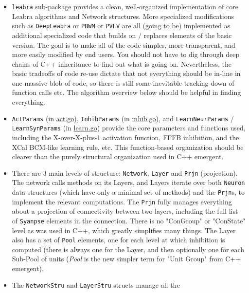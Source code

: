 \begin{itemize}
\item
  \texttt{leabra} sub-package provides a clean, well-organized
  implementation of core Leabra algorithms and Network structures. More
  specialized modifications such as \texttt{DeepLeabra} or \texttt{PBWM}
  or \texttt{PVLV} are all (going to be) implemented as additional
  specialized code that builds on / replaces elements of the basic
  version. The goal is to make all of the code simpler, more
  transparent, and more easily modified by end users. You should not
  have to dig through deep chains of C++ inheritance to find out what is
  going on. Nevertheless, the basic tradeoffs of code re-use dictate
  that not everything should be in-line in one massive blob of code, so
  there is still some inevitable tracking down of function calls etc.
  The algorithm overview below should be helpful in finding everything.
\item
  \texttt{ActParams} (in
  \href{https://github.com/emer/leabra/blob/master/leabra/act.go}{act.go}),
  \texttt{InhibParams} (in
  \href{https://github.com/emer/leabra/blob/master/leabra/inhib.go}{inhib.go}),
  and \texttt{LearnNeurParams} / \texttt{LearnSynParams} (in
  \href{https://github.com/emer/leabra/blob/master/leabra/learn.go}{learn.go})
  provide the core parameters and functions used, including the
  X-over-X-plus-1 activation function, FFFB inhibition, and the XCal
  BCM-like learning rule, etc. This function-based organization should
  be clearer than the purely structural organization used in C++
  emergent.
\item
  There are 3 main levels of structure: \texttt{Network}, \texttt{Layer}
  and \texttt{Prjn} (projection). The network calls methods on its
  Layers, and Layers iterate over both \texttt{Neuron} data structures
  (which have only a minimal set of methods) and the \texttt{Prjn}s, to
  implement the relevant computations. The \texttt{Prjn} fully manages
  everything about a projection of connectivity between two layers,
  including the full list of \texttt{Syanpse} elements in the
  connection. There is no "ConGroup" or "ConState" level as was used in
  C++, which greatly simplifies many things. The Layer also has a set of
  \texttt{Pool} elements, one for each level at which inhibition is
  computed (there is always one for the Layer, and then optionally one
  for each Sub-Pool of units (\emph{Pool} is the new simpler term for
  "Unit Group" from C++ emergent).
\item
  The \texttt{NetworkStru} and \texttt{LayerStru} structs manage all the

\end{itemize}
